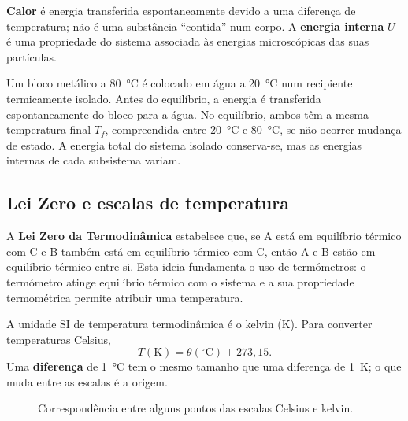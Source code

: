 \documentclass[11pt,a4paper,oneside]{book}
\begin{document}
\textbf{Calor} é energia transferida espontaneamente devido a uma diferença de temperatura; não é uma substância ``contida'' num corpo. A \textbf{energia interna} $U$ é uma propriedade do sistema associada às energias microscópicas das suas partículas.

\begin{exemplo}[title=Exemplo resolvido -- equilíbrio térmico]
Um bloco metálico a \SI{80}{\celsius} é colocado em água a \SI{20}{\celsius} num recipiente termicamente isolado. Antes do equilíbrio, a energia é transferida espontaneamente do bloco para a água. No equilíbrio, ambos têm a mesma temperatura final $T_f$, compreendida entre \SI{20}{\celsius} e \SI{80}{\celsius}, se não ocorrer mudança de estado. A energia total do sistema isolado conserva-se, mas as energias internas de cada subsistema variam.
\end{exemplo}

\subsection*{Lei Zero e escalas de temperatura}
A \textbf{Lei Zero da Termodinâmica} estabelece que, se A está em equilíbrio térmico com C e B também está em equilíbrio térmico com C, então A e B estão em equilíbrio térmico entre si. Esta ideia fundamenta o uso de termómetros: o termómetro atinge equilíbrio térmico com o sistema e a sua propriedade termométrica permite atribuir uma temperatura.

A unidade SI de temperatura termodinâmica é o kelvin (K). Para converter temperaturas Celsius,
\[
T(\mathrm K)=\theta(^{\circ}\mathrm C)+273{,}15.
\]
Uma \textbf{diferença} de \SI{1}{\celsius} tem o mesmo tamanho que uma diferença de \SI{1}{K}; o que muda entre as escalas é a origem.

\begin{figure}[H]
\centering
{}
\caption{Correspondência entre alguns pontos das escalas Celsius e kelvin.}
\end{figure}
\end{document}
